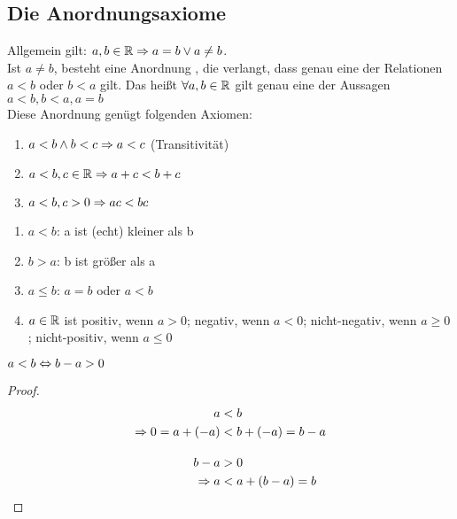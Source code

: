 \subsection{Die Anordnungsaxiome}

Allgemein gilt: $a,b\in\mathbb{R} \Rightarrow{} a = b \lor a \neq b$.\\
Ist $a\neq b$, besteht eine Anordnung \anf{$<$}, die verlangt, dass genau eine der Relationen $a<b$ oder $b<a$ gilt.
Das heißt $\forall a,b\in\mathbb{R}$ gilt genau eine der Aussagen $a<b, b<a, a= b$\\
Diese Anordnung genügt folgenden Axiomen:
\begin{axiom}[Anordnungsaxiome]
    \theoremescape
    \begin{enumerate}[label=(II.\arabic*)]
        \item $a<b \land b < c \Rightarrow{} a < c$ (Transitivität)
        \item $a<b, c \in\mathbb{R} \Rightarrow{} a + c < b + c$
        \item $a<b, c > 0 \Rightarrow{} ac < bc$
    \end{enumerate}
\end{axiom}

\begin{notation}
    \theoremescape
    \begin{enumerate}[label=-]
        \item $a < b$: a ist (echt) kleiner als b
        \item $b > a$: b ist größer als a
        \item $a\leq b$: $a=b$ oder $a < b$
        \item $a\in\mathbb{R}$ ist positiv, wenn $a>0$; negativ, wenn $a <0$; nicht-negativ, wenn $a\geq 0$; nicht-positiv, wenn $a\leq 0$
    \end{enumerate}
\end{notation}

\begin{beispiel}
    $a<b\Leftrightarrow{} b - a > 0$
    \begin{proof}
        \begin{align*}
            a &<b\\
            \Rightarrow{} 0 = a + \left(-a\right) &< b + \left(-a\right) = b - a\\[10pt]
            b-a &>0\\
            \Rightarrow{} a &< a + \left(b-a\right) = b\qedhere
        \end{align*}
    \end{proof}
\end{beispiel}

